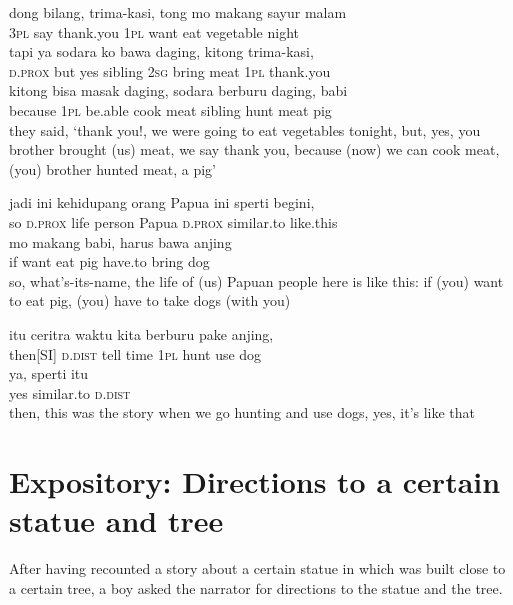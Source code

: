 \ea
\gll   dong    {bilang,}    {trima-kasi,}    {tong}    {mo}    {makang}    {sayur}    {malam}\\
  \textsc{3pl}    {say}    {thank.you}    {\textsc{1pl}}    {want}    {eat}    {vegetable}    {night}\\
   tapi    {ya}    {sodara}    {ko}    {bawa}    {daging,}    {kitong}    {trima-kasi,}\\
   {\textsc{d.prox}}   but    {yes}    {sibling}    {\textsc{2sg}}    {bring}    {meat}    {\textsc{1pl}}    {thank.you}\\
    {kitong}    {bisa}    {masak}    {daging,}    {sodara}    {berburu}    {daging,}   babi\\
   {because}    {\textsc{1pl}}    {be.able}    {cook}    {meat}    {sibling}    {hunt}    {meat}   pig\\
\glt
they said, ‘thank you!, we were going to eat vegetables tonight, but, yes, you brother brought (us) meat, we say thank you, because (now) we can cook meat, (you) brother hunted meat, a pig’
\z

\ea
\gll   jadi    {ini}    {kehidupang}    {orang}    {Papua}    {ini}   sperti   begini,\\
  so    {\textsc{d.prox}}    {life}    {person}    {Papua}    {\textsc{d.prox}}   similar.to   like.this\\
   mo    {makang}    {babi,}    {harus}    {bawa}    {anjing}\\
   {if}   want    {eat}    {pig}    {have.to}    {bring}    {dog}\\
\glt
so, what’s-its-name, the life of (us) Papuan people here is like this: if (you) want to eat pig, (you) have to take dogs (with you)
\z

\ea
{}    {itu}   ceritra   waktu   kita   berburu   pake   anjing,\\
   {then[SI]}    {\textsc{d.dist}}   tell   time   \textsc{1pl}   hunt   use   dog\\
\gll ya,    {sperti}    {itu}\\
  yes    {similar.to}    {\textsc{d.dist}}\\
\glt
then, this was the story when we go hunting and use dogs, yes, it’s like that
\z %

\section{Expository: Directions to a certain statue and tree}
\label{Para_B.7}
After having recounted a story about a certain statue in  which was built close to a certain tree, a boy asked the narrator for directions to the statue and the tree.

